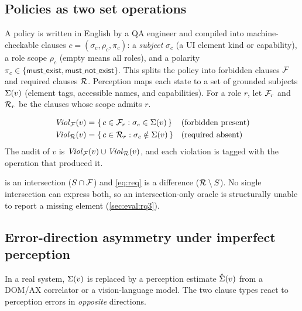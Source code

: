 \subsection{Policies as two set operations}

A policy is written in English by a QA engineer and compiled into
machine-checkable clauses $c=(\sigma_c,\rho_c,\pi_c)$: a \emph{subject}
$\sigma_c$ (a UI element kind or capability), a role scope $\rho_c$ (empty
means all roles), and a polarity $\pi_c\in\{\textsf{must\_exist},
\textsf{must\_not\_exist}\}$. This splits the policy into forbidden clauses
$\mathcal{F}$ and required clauses $\mathcal{R}$. Perception maps each state to a set of
grounded subjects $\Sigma(v)$ (element tags, accessible names, and capabilities).
For a role $r$, let $\mathcal{F}_r$ and $\mathcal{R}_r$ be the clauses whose scope admits
$r$.

\begin{definition}
\begin{align}
\mathit{Viol}_{\mathcal{F}}(v) &= \{\,c\in\mathcal{F}_r : \sigma_c\in\Sigma(v)\,\}
  && \text{(forbidden present)}\label{eq:forb}\\
\mathit{Viol}_{\mathcal{R}}(v)  &= \{\,c\in\mathcal{R}_r : \sigma_c\notin\Sigma(v)\,\}
  && \text{(required absent)}\label{eq:req}
\end{align}
The audit of $v$ is $\mathit{Viol}_{\mathcal{F}}(v)\cup\mathit{Viol}_{\mathcal{R}}(v)$, and each
violation is tagged with the operation that produced it.
\end{definition}

 is an intersection ($S\cap\mathcal{F}$) and \cref{eq:req} is a
difference ($\mathcal{R}\setminus S$). No single intersection can express both, so an
intersection-only oracle is structurally unable to report a missing element
(\cref{sec:eval:rq3}).

\subsection{Error-direction asymmetry under imperfect perception}
\label{sec:model:asym}

In a real system, $\Sigma(v)$ is replaced by a perception estimate $\hat{\Sigma}(v)$
from a DOM/AX correlator or a vision-language model. The two clause types react
to perception errors in \emph{opposite} directions.

